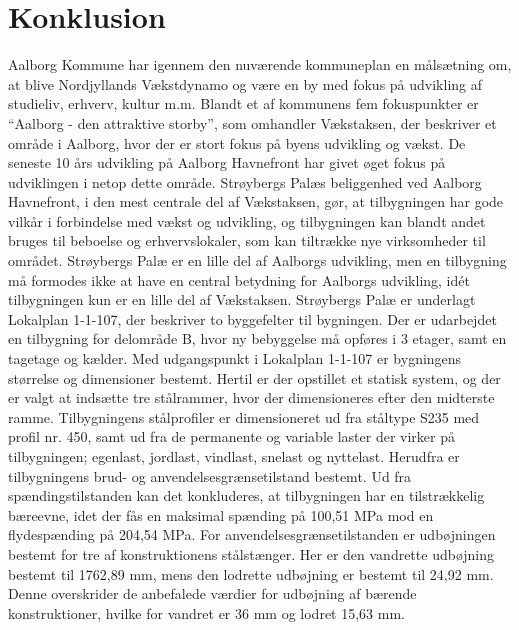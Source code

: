 \chapter{Konklusion}
 Aalborg Kommune har igennem den nuværende kommuneplan en målsætning om, at blive Nordjyllands Vækstdynamo og være en by med fokus på udvikling af studieliv, erhverv, kultur m.m. Blandt et af kommunens fem fokuspunkter er “Aalborg - den attraktive storby”, som omhandler Vækstaksen, der beskriver et område i Aalborg, hvor der er stort fokus på byens udvikling og vækst.
 \newline \indent{     }  De seneste 10 års udvikling på Aalborg Havnefront har givet øget fokus på udviklingen i netop dette område. Strøybergs Palæs beliggenhed ved Aalborg Havnefront, i den mest centrale del af Vækstaksen, gør, at tilbygningen har gode vilkår i forbindelse med vækst og udvikling, og tilbygningen kan blandt andet bruges til beboelse og erhvervslokaler, som kan tiltrække nye virksomheder til området. Strøybergs Palæ er en lille del af Aalborgs udvikling, men en tilbygning må formodes ikke at have en central betydning for Aalborgs udvikling, idét tilbygningen kun er en lille del af Vækstaksen.
 \newline \indent{     }  Strøybergs Palæ er underlagt Lokalplan 1-1-107, der beskriver to byggefelter til bygningen. Der er udarbejdet en tilbygning for delområde B, hvor ny bebyggelse må opføres i 3 etager, samt en tagetage og kælder. Med udgangspunkt i Lokalplan 1-1-107 er bygningens størrelse og dimensioner bestemt. Hertil er der opstillet et statisk system, og der er valgt at indsætte tre stålrammer, hvor der dimensioneres efter den midterste ramme.
 \newline \indent{     }  Tilbygningens stålprofiler er dimensioneret ud fra ståltype S235 med profil nr. 450, samt ud fra de permanente og variable laster der virker på tilbygningen; egenlast, jordlast, vindlast, snelast og nyttelast. Herudfra er tilbygningens brud- og anvendelsesgrænsetilstand bestemt.
 \newline \indent{     }  Ud fra spændingstilstanden kan det konkluderes, at tilbygningen har en tilstrækkelig bæreevne, idet der fås en maksimal spænding på 100,51 MPa mod en flydespænding på 204,54 MPa. 
 \newline \indent{     }  For anvendelsesgrænsetilstanden er udbøjningen bestemt for tre af konstruktionens stålstænger. Her er den vandrette udbøjning bestemt til 1762,89 mm, mens den lodrette udbøjning er bestemt til 24,92 mm. Denne overskrider de anbefalede værdier for udbøjning af bærende konstruktioner, hvilke for vandret er 36 mm og lodret 15,63 mm.
